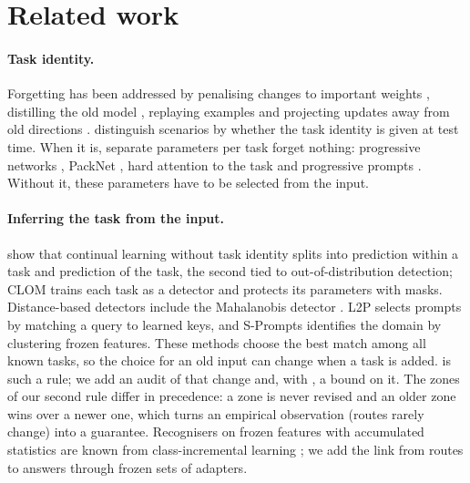 \section{Related work}
\label{sec:related}

\paragraph{Task identity.} Forgetting has been addressed by penalising changes to important weights
\citep{kirkpatrick2017ewc}, distilling the old model \citep{li2016lwf}, replaying examples
\citep{shin2017dgr} and projecting updates away from old directions \citep{saha2021gpm}.
\citet{vandeven2019three} distinguish scenarios by whether the task identity is given at test time.
When it is, separate parameters per task forget nothing: progressive networks
\citep{rusu2016progressive}, PackNet \citep{mallya2018packnet}, hard attention to the task
\citep{serra2018hat} and progressive prompts \citep{razdaibiedina2023progressive}. Without it, these
parameters have to be selected from the input.

\paragraph{Inferring the task from the input.} \citet{kim2022theoretical} show that continual learning
without task identity splits into prediction within a task and prediction of the task, the second tied
to out-of-distribution detection; CLOM \citep{kim2022clom} trains each task as a detector and protects
its parameters with masks. Distance-based detectors include the Mahalanobis detector
\citep{lee2018mahalanobis}. L2P \citep{wang2022l2p} selects prompts by matching a query to learned
keys, and S-Prompts \citep{wang2022sprompts} identifies the domain by clustering frozen features.
These methods choose the best match among all known tasks, so the choice for an old input can change
when a task is added. \recog{} is such a rule; we add an audit of that change and, with \handicap{}, a
bound on it. The zones of our second rule differ in precedence: a zone is never revised and an older
zone wins over a newer one, which turns an empirical observation (routes rarely change) into a
guarantee. Recognisers on frozen features with accumulated statistics are known from class-incremental
learning \citep{mcdonnell2023ranpac,zhuang2022acil}; we add the link from routes to answers through
frozen sets of adapters.

